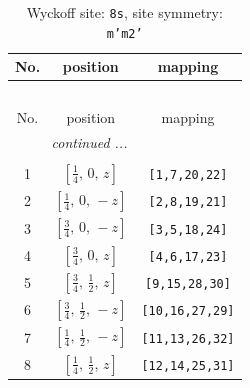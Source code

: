 \documentclass[fleqn,8pt]{jsarticle}
\begin{document}
\begin{longtable}{ccc}
\caption{Wyckoff site: {\tt 8s}, site symmetry: {\tt m'm2'}}
 \\
 \hline \hline
No. & position & mapping \\ \hline \endfirsthead

\multicolumn{2}{l}{\tablename\ \thetable{}} \\
 \hline \hline
No. & position & mapping \\ \hline \endhead

 \hline \hline
\multicolumn{2}{r}{\footnotesize\it continued ...} \\ \endfoot

 \hline \hline
\multicolumn{2}{r}{} \\ \endlastfoot

1 & $\left[ \frac{1}{4},\, 0,\, z \right]$ & {\tt [1,7,20,22]} \\ \hline
2 & $\left[ \frac{1}{4},\, 0,\, - z \right]$ & {\tt [2,8,19,21]} \\ \hline
3 & $\left[ \frac{3}{4},\, 0,\, - z \right]$ & {\tt [3,5,18,24]} \\ \hline
4 & $\left[ \frac{3}{4},\, 0,\, z \right]$ & {\tt [4,6,17,23]} \\ \hline
5 & $\left[ \frac{3}{4},\, \frac{1}{2},\, z \right]$ & {\tt [9,15,28,30]} \\ \hline
6 & $\left[ \frac{3}{4},\, \frac{1}{2},\, - z \right]$ & {\tt [10,16,27,29]} \\ \hline
7 & $\left[ \frac{1}{4},\, \frac{1}{2},\, - z \right]$ & {\tt [11,13,26,32]} \\ \hline
8 & $\left[ \frac{1}{4},\, \frac{1}{2},\, z \right]$ & {\tt [12,14,25,31]} \\
\end{longtable}
\renewcommand{\arraystretch}{1.2}
\end{document}
